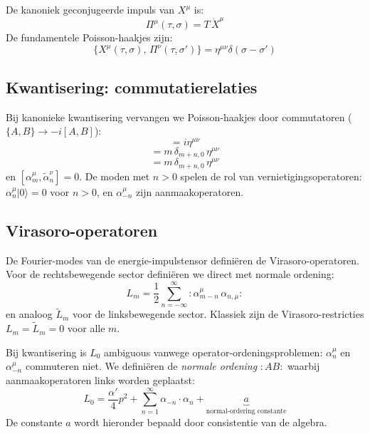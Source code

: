 \documentclass[12pt,a4paper]{article}
\begin{document}
De kanoniek geconjugeerde impuls van $X^\mu$ is:
\begin{equation}
  \Pi^\mu(\tau,\sigma) = T\,\dot X^\mu
\end{equation}
De fundamentele Poisson-haakjes zijn:
\begin{equation}
  \{X^\mu(\tau,\sigma),\,\Pi^\nu(\tau,\sigma')\} = \eta^{\mu\nu}\delta(\sigma-\sigma')
\end{equation}

\subsection{Kwantisering: commutatierelaties}

Bij kanonieke kwantisering vervangen we Poisson-haakjes door commutatoren ($\{A,B\} \to -i[A,B]$):
\begin{equation}
  [x^\mu,\,p^\nu] = i\eta^{\mu\nu}
\end{equation}
\begin{equation}
  [\alpha_m^\mu,\,\alpha_n^\nu] = m\,\delta_{m+n,0}\,\eta^{\mu\nu}
  \label{eq:comm_alpha}
\end{equation}
\begin{equation}
  [\tilde\alpha_m^\mu,\,\tilde\alpha_n^\nu] = m\,\delta_{m+n,0}\,\eta^{\mu\nu}
\end{equation}
en $[\alpha_m^\mu,\tilde\alpha_n^\nu] = 0$. De moden met $n > 0$ spelen de rol van vernietigingsoperatoren: $\alpha_n^\mu|0\rangle = 0$ voor $n > 0$, en $\alpha_{-n}^\mu$ zijn aanmaakoperatoren.

\subsection{Virasoro-operatoren}

De Fourier-modes van de energie-impulstensor defini\"eren de Virasoro-operatoren. Voor de rechtsbewegende sector defini\"eren we direct met normale ordening:
\begin{equation}
  L_m = \frac{1}{2}\sum_{n=-\infty}^{\infty} :\!\alpha_{m-n}^\mu\,\alpha_{n,\mu}\!:
  \label{eq:Lm_klassiek}
\end{equation}
en analoog $\tilde L_m$ voor de linksbewegende sector. Klassiek zijn de Virasoro-restricties $L_m = \tilde L_m = 0$ voor alle $m$.

Bij kwantisering is $L_0$ ambiguous vanwege operator-ordeningsproblemen: $\alpha_n^\mu$ en $\alpha_{-n}^\mu$ commuteren niet. We defini\"eren de \emph{normale ordening} $:AB:$ waarbij aanmaakoperatoren links worden geplaatst:
\begin{equation}
  L_0 = \frac{\alpha'}{4}p^2 + \sum_{n=1}^{\infty}\alpha_{-n}\cdot\alpha_n + \underbrace{a}_{\text{normal-ordering constante}}
\end{equation}
De constante $a$ wordt hieronder bepaald door consistentie van de algebra.
\end{document}
